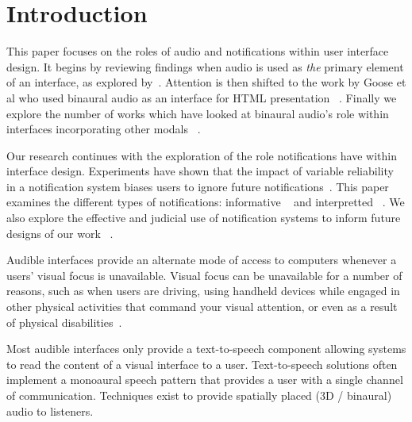 \newpage                                                 \chapter{Introduction}
\renewcommand{\thepage }{\arabic{page}}                    \setcounter{page}{1}




This paper focuses on the roles of audio and notifications within user interface
design. It begins by reviewing findings when audio is used as \textit{the}
primary element of an interface, as explored by~\cite{arons1991hyperspeech,
shilling2000virtual}. Attention is then shifted to the work by Goose et al who
used binaural audio as an interface for HTML presentation
~\cite{goose19993dAudio}. Finally we explore the number of works which have
looked at binaural audio's role  within interfaces incorporating other modals
~\cite{ yu2006novel, marentakis2004study}.

Our research continues with the exploration of the role notifications  have
within interface design. Experiments have shown that the impact of variable
reliability in a notification system biases users to ignore future
notifications~\cite{ leetiernan2001effective}. This paper examines the different
types of notifications: informative ~\cite{maltz2000cue} and interpretted
~\cite{horvitz1999principles}.   We also explore the effective and judicial use
of notification systems to  inform future designs of our work
~\cite{cutrell2001notification}.



Audible interfaces provide an alternate mode of access to computers whenever a
users’ visual focus is unavailable. Visual focus can be unavailable for a number
of reasons, such as when users are driving, using handheld devices while engaged
in other physical activities that command your visual attention, or even as a
result of physical disabilities~\cite{michelis2008disappearing}.

Most audible interfaces only provide a text-to-speech component allowing systems
to read the content of a visual interface to a user.  Text-to-speech solutions
often implement a monoaural speech pattern that provides a user with a single
channel of communication. Techniques exist to provide spatially placed (3D
/ binaural) audio to listeners.



